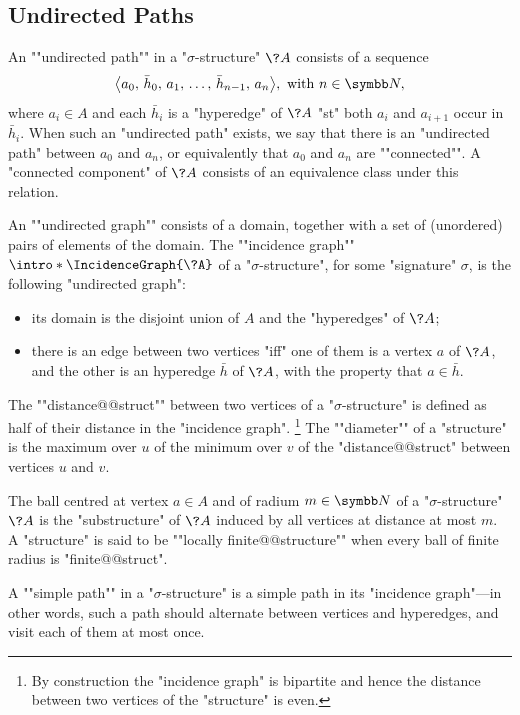 \subsection{Undirected Paths}

An \AP""undirected path"" in a "$\sigma$-structure" $\?A$ consists of a sequence
\[\big\langle a_0,\, \bar h_0,\, a_1,\, \dotsc,\, \bar h_{n-1},\, a_n\big\rangle, \text{ with } n \in \N,\]
where $a_i \in A$ and each $\bar h_i$ is a "hyperedge" of $\?A$ "st" both
$a_i$ and $a_{i+1}$ occur in $\bar h_i$. When such an "undirected path" exists, we say that
there is an "undirected path" between $a_0$ and $a_n$, or equivalently
that $a_0$ and $a_n$ are \AP""connected"".%
A \AP"connected component" of $\?A$ consists of an equivalence class under this relation.

An ""undirected graph"" consists of a domain, together with
a set of (unordered) pairs of elements of the domain.
The ""incidence graph"" $\intro*\IncidenceGraph{\?A}$ of a "$\sigma$-structure",
for some "signature" $\sigma$, is the following "undirected graph":
\begin{itemize}
	\item its domain is the disjoint union of $A$
		and the "hyperedges" of $\?A$;
	\item there is an edge between two vertices "iff" one of them
		is a vertex $a$ of $\?A$, and the other is an hyperedge
		$\bar h$ of $\?A$, with the property that $a \in \bar h$.
\end{itemize}

The \AP""distance@@struct"" between two vertices of a "$\sigma$-structure"
is defined as half of their distance in the "incidence graph".%
\footnote{By construction the "incidence graph" is bipartite and hence
the distance between two vertices of the "structure" is even.}
The \AP""diameter"" of a "structure" is the maximum over $u$
of the minimum over $v$ of the "distance@@struct" between vertices $u$ and $v$.

The ball centred at vertex $a\in A$ and of radium $m\in\N$ of
a "$\sigma$-structure" $\?A$ is the "substructure" of $\?A$ induced by
all vertices at distance at most $m$.
A "structure" is said to be \AP""locally finite@@structure""
when every ball of finite radius is "finite@@struct".

A \AP""simple path"" in a "$\sigma$-structure" is a
simple path in its "incidence graph"---in other words, 
such a path should alternate between vertices and hyperedges,
and visit each of them at most once.

